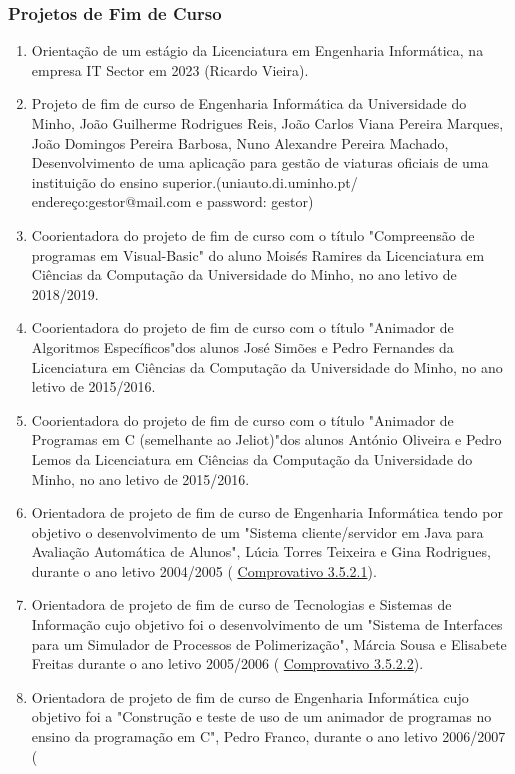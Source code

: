 \documentclass[11pt]{article}
\begin{document}
\subsubsection{Projetos de Fim de Curso}
\begin{enumerate}
\item{Orientação de um estágio da Licenciatura em Engenharia Informática, na empresa IT Sector em 2023 (Ricardo Vieira).}
\item{Projeto de fim de curso de Engenharia Informática da Universidade do Minho, João Guilherme Rodrigues Reis, João Carlos Viana Pereira Marques, João Domingos Pereira Barbosa, Nuno Alexandre Pereira Machado, Desenvolvimento de uma aplicação para gestão de viaturas oficiais de uma instituição do ensino superior.(uniauto.di.uminho.pt/ endereço:gestor@mail.com e password: gestor)}
\item{Coorientadora do projeto de fim de curso com o título "Compreensão de programas em Visual-Basic" do aluno Moisés Ramires da Licenciatura em Ciências da Computação da Universidade do Minho, no ano letivo de 2018/2019.}
\item{Coorientadora do projeto de fim de curso com o título "Animador de Algoritmos Específicos"dos alunos José Simões e Pedro Fernandes da Licenciatura em Ciências da Computação da Universidade do Minho, no ano letivo de 2015/2016.}
\item{Coorientadora do projeto de fim de curso com o título "Animador de Programas em C (semelhante ao Jeliot)"dos alunos António Oliveira e Pedro Lemos da Licenciatura em Ciências da Computação da Universidade do Minho, no ano letivo de 2015/2016.}
\item{Orientadora de projeto de fim de curso de Engenharia Informática tendo por objetivo o desenvolvimento de um "Sistema cliente/servidor em Java para Avaliação Automática de Alunos", Lúcia Torres Teixeira e Gina Rodrigues, durante o ano letivo 2004/2005 (
\href{run:CoOrientTrabalhos/projFimCursoEI.pdf}{Comprovativo 3.5.2.1}).}
\item{Orientadora de projeto de fim de curso de Tecnologias e Sistemas de Informação cujo objetivo foi o desenvolvimento de um "Sistema de Interfaces para um Simulador de Processos de Polimerização", Márcia Sousa e Elisabete Freitas durante o ano letivo 2005/2006 (
\href{run:CoOrientTrabalhos/projFimCursoTSI.pdf}{Comprovativo 3.5.2.2}).}
\item{Orientadora de projeto de fim de curso de Engenharia Informática cujo objetivo foi a "Construção e teste de uso de um animador de programas no ensino da programação em C", Pedro Franco, durante o ano letivo 2006/2007 (
}
\end{enumerate}
\end{document}
